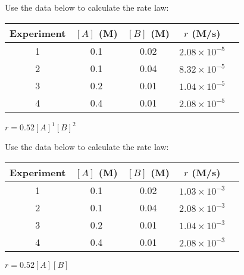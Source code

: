 \documentclass[main.tex]{subfiles}
\begin{document}
\begin{multicols*}{2}
\begin{question}[ID=\the\value{numA}]
Use the data below to calculate the rate law:
\begin{center}\begin{tabular}[t]{  c c  c c  c  }
\toprule
Experiment	&$[A]$ (M)&		$[B]$ (M)	&	$r$ (M/s)\\
\midrule
1&	0.1&	0.02&	$2.08\times 10^{-5}$\\
2&	0.1&	0.04&	$8.32\times 10^{-5}$\\
3&	0.2&	0.01&	$1.04\times 10^{-5}$\\
4&	0.4	&0.01	&$2.08\times 10^{-5}$\\
\bottomrule
\end{tabular}\end{center}
\end{question}
\begin{solution}
$r=0.52[A]^1[B]^2$
\hspace{0.1cm}\end{solution}%

\begin{question}[ID=\the\value{numA}]
Use the data below to calculate the rate law:
\begin{center}\begin{tabular}[t]{  c c  c c  c  }
\toprule
Experiment	&$[A]$ (M)&		$[B]$ (M)	&	$r$ (M/s)\\
\midrule
1&	0.1&	0.02&	$1.03\times 10^{-3}$\\
2&	0.1&	0.04&	$2.08\times 10^{-3}$\\
3&	0.2&	0.01&	$1.04\times 10^{-3}$\\
4&	0.4	&0.01	&$2.08\times 10^{-3}$\\
\bottomrule
\end{tabular}\end{center}
\end{question}
\begin{solution}
$r=0.52[A][B]$
\hspace{0.1cm}\end{solution}%




\end{multicols*}
\end{document}
